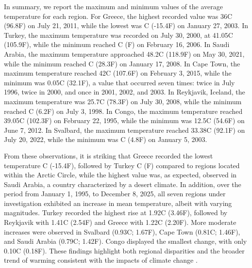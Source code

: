 \documentclass[12pt]{Definitions/academia}
\begin{document}
In summary, we report the maximum and minimum values of the average
temperature for each region. For Greece, the highest recorded value
was 36\textdegree C (96.8\textdegree F) on July 21, 2011, while the lowest was \textdegree C
(-15.4\textdegree F) on January 27, 2003. In Turkey, the maximum temperature
was recorded on July 30, 2000, at 41.05\textdegree C (105.9\textdegree F), while the minimum
reached \textdegree C (\textdegree F) on February 16, 2006.
In Saudi Arabia, the maximum temperature approached 48.2\textdegree C (118.9\textdegree F)
on May 30, 2021, while the minimum reached \textdegree C (28.3\textdegree F)
on January 17, 2008. In Cape Town, the maximum temperature reached
42\textdegree C (107.6\textdegree F) on February 3, 2015, while the minimum was 0.05\textdegree C (32.1\textdegree F),
a value that occurred seven times: twice in July 1996, twice in 2000,
and once in 2001, 2002, and 2003. In Reykjavik, Iceland, the maximum
temperature was 25.7\textdegree C (78.3\textdegree F) on July 30, 2008, while the minimum
reached \textdegree C (6.2\textdegree F) on July 3, 1998. In Congo, the maximum
temperature reached 39.05\textdegree C (102.3\textdegree F) on February 22, 1995, while
the minimum was 12.5\textdegree C (54.6\textdegree F) on June 7, 2012. In Svalbard, the
maximum temperature reached 33.38\textdegree C (92.1\textdegree F) on July 20, 2022, while
the minimum was \textdegree C (4.8\textdegree F) on January 5, 2003.

From these observations, it is striking that Greece recorded the lowest
temperature \textdegree C (-15.4\textdegree F), followed by Turkey \textdegree C
(\textdegree F) compared to regions located within the Arctic Circle,
while the highest value was, as expected, observed in Saudi Arabia,
a country characterized by a desert climate. In addition, over the
period from January 1, 1995, to December 8, 2025, all seven regions
under investigation exhibited an increase in mean temperature, albeit
with varying magnitudes. Turkey recorded the highest rise at 1.92\textdegree C
(3.46\textdegree F), followed by Reykjavik with 1.41\textdegree C (2.54\textdegree F) and Greece with
1.22\textdegree C (2.20\textdegree F). More moderate increases were observed in Svalbard
(0.93\textdegree C; 1.67\textdegree F), Cape Town (0.81\textdegree C; 1.46\textdegree F), and Saudi Arabia (0.79\textdegree C;
1.42\textdegree F). Congo displayed the smallest change, with only 0.10\textdegree C (0.18\textdegree F).
These findings highlight both regional disparities and the broader
trend of warming consistent with the impacts of climate change .
\end{document}
